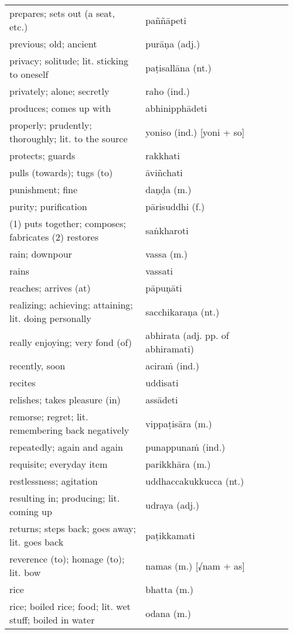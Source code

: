 \documentclass[a5paper]{memoir}
\begin{document}
\begin{longtable}{L{0.48\linewidth} L{0.48\linewidth} H}
prepares; sets out (a seat, etc.) & paññāpeti & \\[0pt]
previous; old; ancient & purāṇa (adj.) & \\[0pt]
privacy; solitude; lit. sticking to oneself & paṭisallāna (nt.) & \\[0pt]
privately; alone; secretly & raho (ind.) & \\[0pt]
produces; comes up with & abhinipphādeti & \\[0pt]
properly; prudently; thoroughly; lit. to the source & yoniso (ind.) [yoni + so] & \\[0pt]
protects; guards & rakkhati & \\[0pt]
pulls (towards); tugs (to) & āviñchati & \\[0pt]
punishment; fine & daṇḍa (m.) & \\[0pt]
purity; purification & pārisuddhi (f.) & \\[0pt]
(1) puts together; composes; fabricates (2) restores & saṅkharoti & \\[0pt]
rain; downpour & vassa (m.) & \\[0pt]
rains & vassati & \\[0pt]
reaches; arrives (at) & pāpuṇāti & \\[0pt]
realizing; achieving; attaining; lit. doing personally & sacchikaraṇa (nt.) & \\[0pt]
really enjoying; very fond (of) & abhirata (adj. pp. of abhiramati) & \\[0pt]
recently, soon & aciraṁ (ind.) & \\[0pt]
recites & uddisati & \\[0pt]
relishes; takes pleasure (in) & assādeti & \\[0pt]
remorse; regret; lit. remembering back negatively & vippaṭisāra (m.) & \\[0pt]
repeatedly; again and again & punappunaṁ (ind.) & \\[0pt]
requisite; everyday item & parikkhāra (m.) & \\[0pt]
restlessness; agitation & uddhaccakukkucca (nt.) & \\[0pt]
resulting in; producing; lit. coming up & udraya (adj.) & \\[0pt]
returns; steps back; goes away; lit. goes back & paṭikkamati & \\[0pt]
reverence (to); homage (to); lit. bow & namas (m.) [√nam + as] & \\[0pt]
rice & bhatta (m.) & \\[0pt]
rice; boiled rice; food; lit. wet stuff; boiled in water & odana (m.) & \\[0pt]

\end{longtable}
\end{document}
